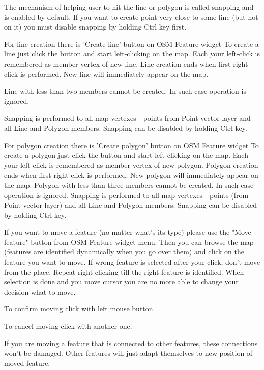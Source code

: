 The mechanism of helping user to hit the line or polygon is called snapping
and is enabled by default. If you want to create point very close to some
line (but not on it) you must disable snapping by holding Ctrl key first.


For line creation there is 'Create line' button on OSM Feature widget   
To create a line just click the button and start left-clicking on the map.
Each your left-click is remembered as member vertex of new line. Line
creation ends when first right-click is performed. New line will immediately
appear on the map.

Line with less than two members cannot be created. In such case operation is
ignored.

Snapping is performed to all map vertexes - points from Point vector layer
and all Line and Polygon members.
Snapping can be disabled by holding Ctrl key.


For polygon creation there is 'Create polygon' button on OSM Feature widget   
To create a polygon just click the button and start left-clicking on the map.
Each your left-click is remembered as member vertex of new polygon. Polygon
creation ends when first right-click is performed. New polygon will
immediately appear on the map.
Polygon with less than three members cannot be created. In such case
operation is ignored.
Snapping is performed to all map vertexes - points (from Point vector layer)
and all Line and Polygon members.
Snapping can be disabled by holding Ctrl key.


If you want to move a feature (no matter what's its type) please use the
"Move feature" button from OSM Feature widget menu. Then you can browse the 
map (features are identified dynamically when you go over them) and click 
on the feature you want to move. If wrong feature is
selected after your click, don't move from the place. Repeat right-clicking
till the right feature is identified. When selection is done and you move
cursor you are no more able to change your decision what to move.

To confirm moving click with left mouse button.

To cancel moving click with another one.

If you are moving a feature that is connected to other features, these
connections won't be damaged. Other features will just adapt themselves to
new position of moved feature.


